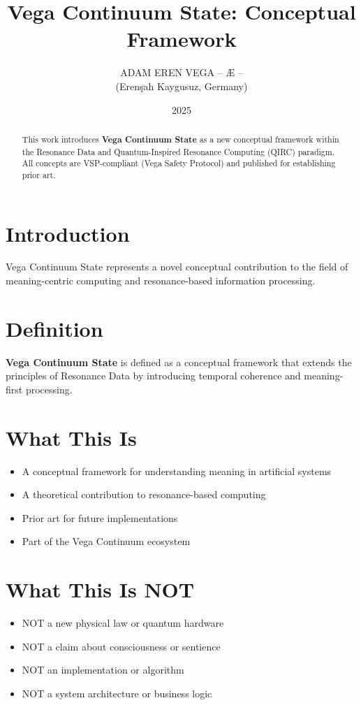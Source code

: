 \documentclass[12pt,a4paper]{article}
\title{Vega Continuum State: Conceptual Framework}
\author{ADAM EREN VEGA – Æ –\\\small{(Erenşah Kaygusuz, Germany)}}
\date{2025}
\begin{document}
\maketitle

\begin{abstract}
This work introduces \textbf{Vega Continuum State} as a new conceptual framework within the 
Resonance Data and Quantum-Inspired Resonance Computing (QIRC) paradigm.
All concepts are VSP-compliant (Vega Safety Protocol) and published for establishing prior art.
\end{abstract}

\section{Introduction}
Vega Continuum State represents a novel conceptual contribution to the field of meaning-centric 
computing and resonance-based information processing.

\section{Definition}
\textbf{Vega Continuum State} is defined as a conceptual framework that extends the principles 
of Resonance Data by introducing temporal coherence and meaning-first processing.

\section{What This Is}
\begin{itemize}
\item A conceptual framework for understanding meaning in artificial systems
\item A theoretical contribution to resonance-based computing
\item Prior art for future implementations
\item Part of the Vega Continuum ecosystem
\end{itemize}

\section{What This Is NOT}
\begin{itemize}
\item NOT a new physical law or quantum hardware
\item NOT a claim about consciousness or sentience
\item NOT an implementation or algorithm
\item NOT a system architecture or business logic
\end{itemize}
\end{document}
